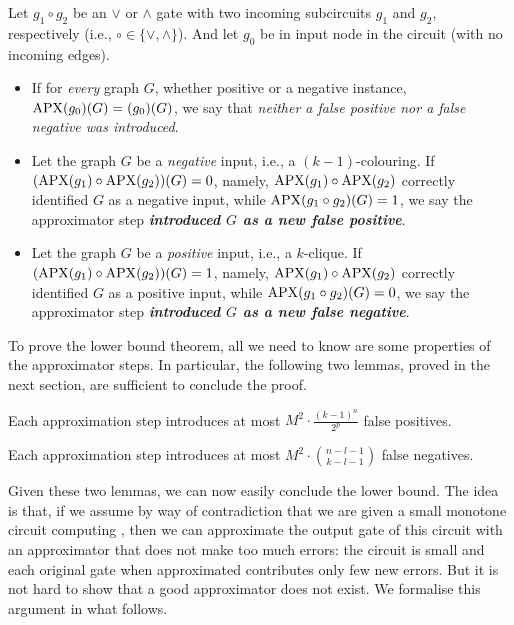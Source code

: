 \begin{definition}
Let $g_1\circ g_2$ be an $\lor$ or $\land$ gate with two incoming subcircuits $g_1$ and $g_2$, respectively (i.e., $\circ\in\{\lor,\land\}$). And let $g_0$ be in input node in the circuit (with no incoming edges).
\begin{itemize}
\item 
If for \emph{every} graph $G$, whether positive or a  negative instance, 
$\mathrm{APX}(g_0)(G)=(g_0)(G)$, we say that \emph{neither a false positive nor a false negative was introduced}.  
 
\item 
Let the graph $G$ be a \emph{negative} input, i.e., a $(k-1)$-colouring. If $(\mathrm{APX}(g_1)\circ \mathrm{APX}(g_2))(G)=0$, namely, $\mathrm{APX}(g_1)\circ \mathrm{APX}(g_2)$ correctly identified $G$ as a negative input, 
while $\mathrm{APX}(g_1\circ g_2)(G)=1$, we say the approximator step \emph{\textbf{introduced $G$ as a new false positive}}. 
\item Let the graph $G$ be a \emph{positive} input, i.e., a $k$-clique. If $(\mathrm{APX}(g_1)\circ \mathrm{APX}(g_2))(G)=1$, namely, $\mathrm{APX}(g_1)\circ \mathrm{APX}(g_2)$ correctly identified $G$ as a positive input, while 
$\mathrm{APX}(g_1\circ g_2)(G)=0$, we say the approximator 
step \textbf{\emph{introduced $G$ as a new false negative}}.
\end{itemize}
\end{definition}

To prove the lower bound theorem, all we need to know are some properties of the approximator steps. In particular, the following two lemmas, proved in the next section, are sufficient to conclude the proof.   







\begin{lemma}\label{lem:new-false-positives}
Each approximation step introduces at most $M^2 \cdot \frac{(k-1)^n}{2^p}$ false positives.
\end{lemma}

\begin{lemma}\label{lem:new-false-negatives}
Each approximation step introduces at most $M^2 \cdot\binom{n-l-1}{k-l-1}$ false negatives.
\end{lemma}


Given these two lemmas, we can now easily conclude the lower bound. The idea is that, if we assume by way of contradiction that we are given a small monotone circuit computing \cliquenk, then we can approximate the output gate of  this circuit with an approximator that does not make too much errors: the circuit is small and each original gate when approximated contributes only few new errors. But it is not hard to show that a good approximator does not exist. We formalise this argument in what follows.






